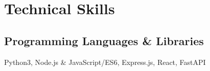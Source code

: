 \documentclass[]{deedy-resume-openfont}
\begin{document}
\begin{minipage}[t]{0.33\textwidth}



    \section{Technical Skills}
    \subsection{Programming Languages \& Libraries}
    Python3, Node.js \& JavaScript/ES6, Express.js, React, FastAPI
    \vspace{\topsep} %
    

\end{minipage}
\end{document}
